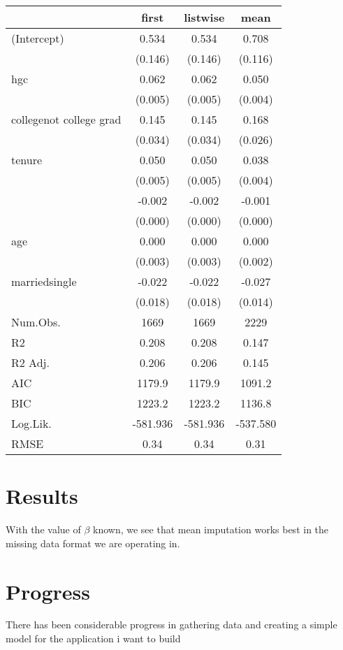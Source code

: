 \documentclass{article}
\begin{document}
\begin{table}[h!]
    \centering
    \begin{tabular}{l S[table-format=-1.3] S[table-format=-1.3] S[table-format=-1.3]}
        \toprule
        & {first} & {listwise} & {mean}\\
        \midrule
        (Intercept) & 0.534 & 0.534 & 0.708\\
                     & (0.146) & (0.146) & (0.116)\\
        hgc          & 0.062 & 0.062 & 0.050\\
                     & (0.005) & (0.005) & {(0.004)}\\
        collegenot college grad & 0.145 & 0.145 & 0.168\\
                     & (0.034) & (0.034) & (0.026)\\
        tenure      & 0.050 & 0.050 & 0.038\\
                     & (0.005) & (0.005) & (0.004)\\
                     & -0.002 & -0.002 & -0.001\\
                     & (0.000) & (0.000) & (0.000)\\
        age         & 0.000 & 0.000 & 0.000\\
                     & (0.003) & (0.003) & (0.002)\\
        marriedsingle & -0.022 & -0.022 & -0.027\\
                     & (0.018) & (0.018) & (0.014)\\
        \midrule
        Num.Obs. & {1669} & {1669} & {2229}\\
        R2 & 0.208 & 0.208 & 0.147\\
        R2 Adj. & 0.206 & 0.206 & 0.145\\
        AIC & 1179.9 & 1179.9 & 1091.2\\
        BIC & 1223.2 & 1223.2 & 1136.8\\
        Log.Lik. & {-581.936} & {-581.936} & {-537.580}\\
        RMSE & 0.34 & 0.34 & 0.31\\
        \bottomrule
    \end{tabular}
\end{table}

\section{Results}

With the value of $\beta$ known, we see that mean imputation works best in the missing data format we are operating in.
\section{Progress}
There has been considerable progress in gathering data and creating a simple model for the application i want to build
\end{document}
